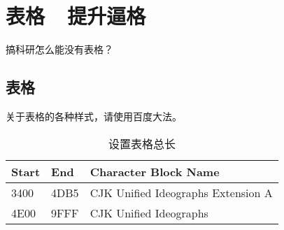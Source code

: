 \section{表格\ \ 提升逼格}

搞科研怎么能没有表格？\\

\subsection{表格}

关于表格的各种样式，请使用百度大法。\\
\begin{table}[H]
\caption{设置表格总长} 
\begin{tabular*}{12cm}{lll}
\hline  
Start & End  & Character Block Name \\  
\hline  
3400  & 4DB5 & CJK Unified Ideographs Extension A \\  
4E00  & 9FFF & CJK Unified Ideographs \\  
\hline  
\end{tabular*} 
\end{table} 
